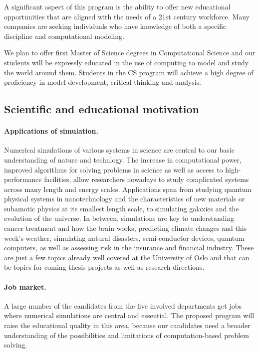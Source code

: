 \documentclass[%
oneside,                 %
final,                   %
10pt]{article}
\begin{document}
A significant aspect of this program is the ability to offer new educational
opportunities that are aligned with the needs of a 21st century
workforce. Many companies are seeking
individuals who have knowledge of both a specific discipline and
computational modeling.

We plan to offer first Master of Science degrees in Computational Science
and  our students will be expressly educated in the use of
computing to model and study the world around them. Students in the CS
program will achieve a high degree of proficiency in model
development, critical thinking and analysis.

\subsection{Scientific and educational motivation}


\paragraph{Applications of simulation.}
Numerical simulations of various systems in science are central to our
basic understanding of nature and technlogy.
The increase in computational power,
improved algorithms for solving problems in science as well as access
to high-performance facilities, allow researchers nowadays to study
complicated systems across many length and energy scales. Applications
span from studying quantum physical systems in nanotechnology and the
characteristics of new materials or subamotic physics at its smallest
length scale, to simulating galaxies and the evolution of the universe.
In between, simulations are key to understanding
cancer treatment and how the brain works,
predicting climate changes and this week's weather,
simulating natural disasters, semi-conductor devices,
quantum computers, as well as assessing risk in the insurance and
financial industry. These are just a few topics
already well covered at the University of Oslo and that can be
topics for coming thesis projects as well as research directions.




\paragraph{Job market.}
A large number of the candidates from the five involved departments
get jobs where numerical simulations are central and essential. The proposed
program will raise the educational quality in this area, because
our candidates need a broader understanding of the possibilities
and limitations of computation-based problem solving.
\end{document}
